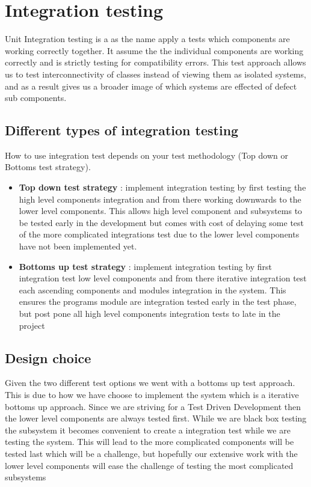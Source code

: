 \section{Integration testing}

Unit Integration testing is a as the name apply a tests which components are working correctly together. It assume the the individual components are working correctly and is strictly testing for compatibility errors. This test approach allows us to test interconnectivity of classes instead of viewing them as isolated systems, and as a result gives us a broader image of which systems are effected of defect sub components. 

\subsection{Different types of integration testing}
How to use integration test depends on your test methodology  (Top down or  Bottoms test strategy). 
\begin{itemize}
	\item \textbf{Top down test strategy} : implement integration testing by first testing the high level components integration and from there working downwards to the lower level components. This allows high level component and subsystems to be tested early in the development but comes with cost of delaying some test of the more complicated integrations test due to the lower level components have not been implemented yet.
	\item\textbf{Bottoms up test strategy} : implement integration testing by first integration test low level components and from there iterative integration test each ascending  components and modules integration in the system. This ensures the programs module are integration tested early in the test phase, but post pone all high level components integration tests to late in the project
\end{itemize}

\subsection{Design choice}
Given the two different test options we went with a bottoms up test approach. This is due to how we have choose to implement the system which is a iterative bottoms up approach. Since we are striving for a Test Driven Development then the lower level components are always tested first. While we are black box testing the subsystem it becomes convenient to create a integration test while we are testing the system. This will lead to the more complicated components will be tested last which will be a challenge, but hopefully our extensive work with the lower level components will ease the challenge of testing the most complicated subsystems